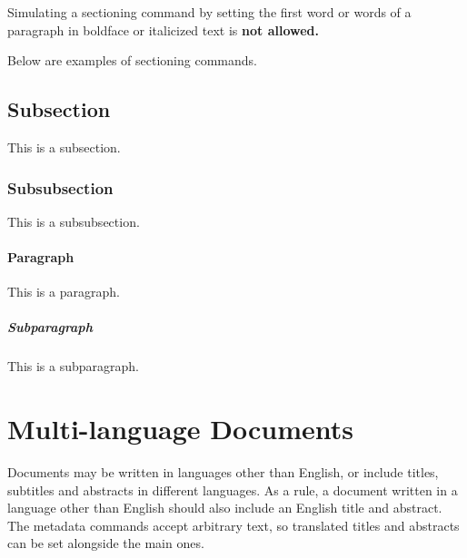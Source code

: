 Simulating a sectioning command by setting the first word or words of a
paragraph in boldface or italicized text is {\bfseries not allowed.}

Below are examples of sectioning commands.

\subsection{Subsection}
\label{sec:subsection}

This is a subsection.

\subsubsection{Subsubsection}
\label{sec:subsubsection}

This is a subsubsection.

\paragraph{Paragraph}

This is a paragraph.

\subparagraph{Subparagraph}

This is a subparagraph.

\section{Multi-language Documents}
\label{sec:languages}

Documents may be written in languages other than English, or include
titles, subtitles and abstracts in different languages. As a rule, a
document written in a language other than English should also include an
English title and abstract. The metadata commands accept arbitrary text,
so translated titles and abstracts can be set alongside the main ones.
